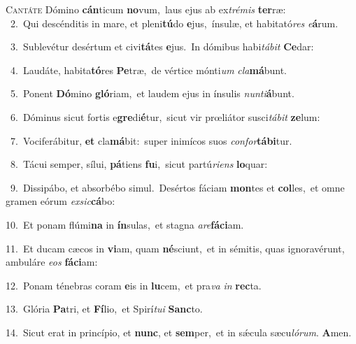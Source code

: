 \lettrine{\initial\textcolor{\initialcolor}{C}}{antáte} Dómino \textbf{cán}\-ticum \textbf{no}\-vum,~\star laus ejus ab ex\-\textit{tré}\-\textit{mis} \textbf{ter}\-ræ:\\
{\numbfont\textcolor{\numbcolor}{~2.}}~Qui descénditis in mare, et pleni\-\textbf{tú}\-do \textbf{e}\-jus,~\star ínsulæ, et habitató\textit{res} \textit{e}\-\textbf{á}rum.\par
{\numbfont\textcolor{\numbcolor}{~3.}}~Sublevétur desértum et civi\-\textbf{tá}\-tes \textbf{e}\-jus.~\star In dómibus habi\-\textit{tá}\-\textit{bit} \textbf{Ce}\-dar:\par
{\numbfont\textcolor{\numbcolor}{~4.}}~Laudáte, habita\-\textbf{tó}\-res \textbf{Pe}\-træ,~\star de vértice mónti\textit{um} \textit{cla}\-\textbf{má}bunt.\par
{\numbfont\textcolor{\numbcolor}{~5.}}~Ponent \textbf{Dó}\-mino \textbf{gló}\-riam,~\star et laudem ejus in ínsulis \textit{nun}\-\textit{ti}\textbf{á}bunt.\par
{\numbfont\textcolor{\numbcolor}{~6.}}~Dóminus sicut fortis e\-\textbf{gre}\-di\-\textbf{é}\-tur,~\star sicut vir prœliátor susci\-\textit{tá}\-\textit{bit} \textbf{ze}\-lum:\par
{\numbfont\textcolor{\numbcolor}{~7.}}~Vociferábitur, \textbf{et} cla\-\textbf{má}\-bit:~\star super inimícos suos \textit{con}\-\textit{for}\textbf{tá}\textbf{bi}tur.\par
{\numbfont\textcolor{\numbcolor}{~8.}}~Tácui semper, sílui, \textbf{pá}\-tiens \textbf{fu}\-i,~\star sicut partú\-\textit{ri}\-\textit{ens} \textbf{lo}\-quar:\par
{\numbfont\textcolor{\numbcolor}{~9.}}~Dissipábo, et absorbébo simul.~\dagger Desértos fáciam \textbf{mon}\-tes et \textbf{col}\-les,~\star et omne gramen eórum \textit{ex}\-\textit{sic}\textbf{cá}bo:\par
{\numbfont\textcolor{\numbcolor}{10.}}~Et ponam flúmi\textbf{na} in \textbf{ín}\-sulas,~\star et stagna \textit{a}\-\textit{re}\textbf{fá}\textbf{ci}am.\par
{\numbfont\textcolor{\numbcolor}{11.}}~Et ducam cæcos in \textbf{vi}\-am, quam \textbf{né}\-sciunt,~\star et in sémitis, quas ignoravérunt, ambuláre \textit{e}\-\textit{os} \textbf{fá}\-\textbf{ci}am:\par
{\numbfont\textcolor{\numbcolor}{12.}}~Ponam ténebras coram \textbf{e}\-is in \textbf{lu}\-cem,~\star et pra\textit{va} \textit{in} \textbf{rec}\-ta.\par
{\numbfont\textcolor{\numbcolor}{13.}}~Glória \textbf{Pa}\-tri, et \textbf{Fí}\-lio,~\star et Spirí\-\textit{tu}\-\textit{i} \textbf{Sanc}\-to.\par
{\numbfont\textcolor{\numbcolor}{14.}}~Sicut erat in princípio, et \textbf{nunc}\-, et \textbf{sem}\-per,~\star et in sǽcula sæcu\-\textit{ló}\-\textit{rum}. \textbf{A}\-men.\par
